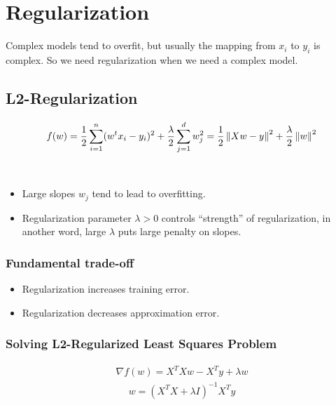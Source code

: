 \setcounter{chapter}{3}
\chapter{Regularization}
\begin{motivation}
    Complex models tend to overfit, but usually the mapping from $x_i$ to $y_i$ is complex.
    So we need regularization when we need a complex model. 
\end{motivation}

\section{L2-Regularization} \label{sec:}
\begin{align*}
    f(w) = \frac{1}{2} \sum\limits_{i=1}^{n} (w^{t}x_i - y_i)^{2} + \frac{\lambda}{2} \sum\limits_{j=1}^{d} w_j^{2} \notag = \frac{1}{2} \left\| Xw-y \right\|_{}^{2} + \frac{\lambda}{2}\left\| w \right\|_{}^{2}
\end{align*}
\begin{intuition} ~
    \begin{itemize}
        \item Large slopes $w_j$ tend to lead to overfitting.
        \item Regularization parameter $\lambda > 0$ controls “strength” of regularization, in another word, large $\lambda$ puts large penalty on slopes.
    \end{itemize}
\end{intuition}

\subsection{Fundamental trade-off} \label{sec:}
\begin{itemize}
    \item Regularization increases training error.
    \item Regularization decreases approximation error.
\end{itemize}

\subsection{Solving L2-Regularized Least Squares Problem} \label{sec:}

\begin{align}
    \nabla f(w) = X^{T}Xw - X^{T}y + \lambda w
\end{align}
\begin{align}
    w = (X^{T}X + \lambda I)^{-1}X^{T}y
\end{align}

